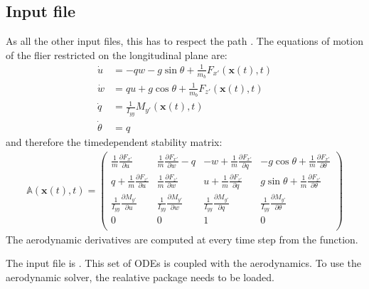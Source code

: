 \documentclass[letterpaper,10pt,english,openany,oneside]{sphinxmanual}
\begin{document}
\subsection{Input file}
\label{\detokenize{tutorial/bird_dynamics:input-file}}
As all the other input files, this has to respect the path . The equations of motion of the flier restricted on the longitudinal plane are:
\begin{equation}\label{equation:tutorial/bird_dynamics:bird_odes}
\begin{split}\dot{u} &= -qw - g\sin \theta + \frac{1}{m_b}{F_{x'}(\mathbf{x}(t),  t)}\\
\dot{w} &= qu + g\cos \theta +\frac{1}{m_b} F_{z'}(\mathbf{x}(t),  t)\\
\dot{q} &=\frac{1}{I_{yy}}M_{y'}(\mathbf{x}(t),  t)\\
\dot{\theta} &= q\end{split}
\end{equation}
and therefore the time\sphinxhyphen{}dependent stability matrix:
\begin{equation}\label{equation:tutorial/bird_dynamics:stability_matrix_bird}
\begin{split}\mathbb{A}(\mathbf{x}(t), t) =
\begin{pmatrix}
\frac{1}{m}\frac{\partial{F_{x'}}}{\partial{u}}  & \frac{1}{m}\frac{\partial{F_{x'}}}{\partial{w}} - q& - w + \frac{1}{m}\frac{\partial{F_{x'}}}{\partial{q}}& -g\cos{\theta} + \frac{1}{m}\frac{\partial{F_{x'}}}{\partial{\theta}}\\
q + \frac{1}{m}\frac{\partial{F_{z'}}}{\partial{u}}  & \frac{1}{m}\frac{\partial{F_{z'}}}{\partial{w}}&  u + \frac{1}{m}\frac{\partial{F_{z'}}}{\partial{q}} & g\sin{\theta} + \frac{1}{m}\frac{\partial{F_{z'}}}{\partial{\theta}}\\
\frac{1}{I_{yy}}\frac{\partial{M_{y'}}}{\partial{u}}  & \frac{1}{I_{yy}}\frac{\partial{M_{y'}}}{\partial{w}}& \frac{1}{I_{yy}}\frac{\partial{M_{y'}}}{\partial{q}}  & \frac{1}{I_{yy}}\frac{\partial{M_{y'}}}{\partial{\theta}}\\
0 & 0 &1 & 0 \\
\end{pmatrix}\end{split}
\end{equation}
The aerodynamic derivatives are computed at every time step from the  function.

The input file is . This set of ODEs is coupled with the aerodynamics. To use the aerodynamic solver, the realative package  needs to be loaded.
\end{document}
